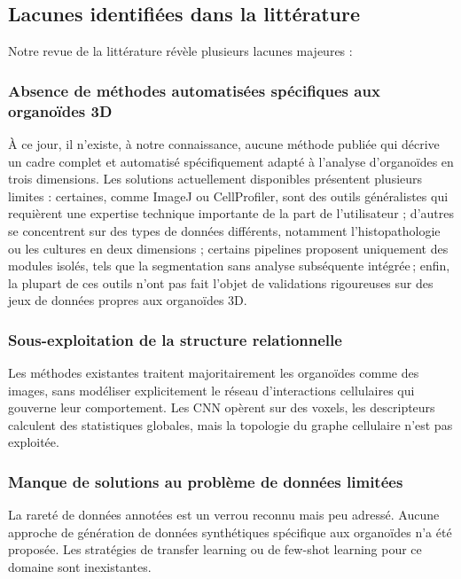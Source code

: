 \subsection{Lacunes identifiées dans la littérature}

Notre revue de la littérature révèle plusieurs lacunes majeures :

\subsubsection{Absence de méthodes automatisées spécifiques aux organoïdes 3D}

À ce jour, il n’existe, à notre connaissance, aucune méthode publiée qui décrive un cadre complet et automatisé spécifiquement adapté à l’analyse d’organoïdes en trois dimensions. Les solutions actuellement disponibles présentent plusieurs limites : certaines, comme ImageJ ou CellProfiler, sont des outils généralistes qui requièrent une expertise technique importante de la part de l'utilisateur ; d’autres se concentrent sur des types de données différents, notamment l’histopathologie ou les cultures en deux dimensions ; certains pipelines proposent uniquement des modules isolés, tels que la segmentation sans analyse subséquente intégrée ; enfin, la plupart de ces outils n’ont pas fait l’objet de validations rigoureuses sur des jeux de données propres aux organoïdes 3D.

\subsubsection{Sous-exploitation de la structure relationnelle}

Les méthodes existantes traitent majoritairement les organoïdes comme des images, sans modéliser explicitement le réseau d'interactions cellulaires qui gouverne leur comportement. Les CNN opèrent sur des voxels, les descripteurs calculent des statistiques globales, mais la topologie du graphe cellulaire n'est pas exploitée.

\subsubsection{Manque de solutions au problème de données limitées}

La rareté de données annotées est un verrou reconnu mais peu adressé. Aucune approche de génération de données synthétiques spécifique aux organoïdes n'a été proposée. Les stratégies de transfer learning ou de few-shot learning pour ce domaine sont inexistantes.

